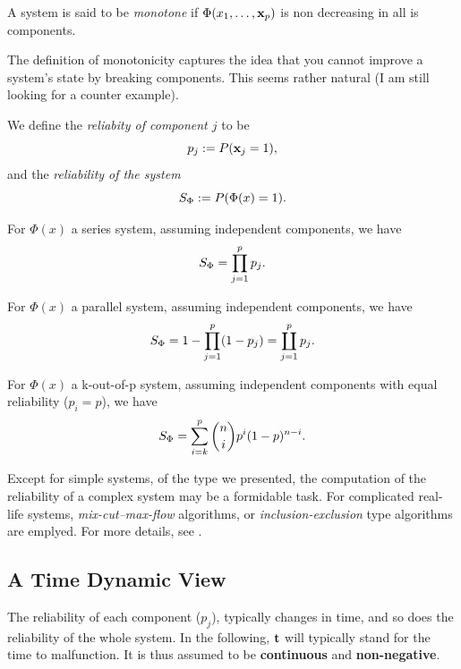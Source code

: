 \begin{definition}
A system is said to be \emph{monotone} if $\Phi(x_1,\dots,\mathbf{x}_p)$ is non decreasing in all is components.
\end{definition}
The definition of monotonicity captures the idea that you cannot improve a system's state by breaking components.
This seems rather natural (I am still looking for a counter example).






\begin{definition}[Reliability]
We define the \emph{reliabity of component $j$} to be $$p_j:= P(\mathbf{x}_j=1),$$ 
and  the \emph{reliability of the system} 
$$ S_\Phi:=P(\Phi(x)=1).$$
\end{definition}


\begin{example}
For $\Phi(x)$ a series system, assuming independent components, we have
$$ S_\Phi= \prod_{j=1}^{p} p_j.$$
\end{example}


\begin{example}
For $\Phi(x)$ a parallel system, assuming independent components, we have
$$ S_\Phi= 1-\prod_{j=1}^{p} (1-p_j)= \coprod_{j=1}^p p_j. $$
\end{example}


\begin{example}
For $\Phi(x)$ a k-out-of-p system, assuming independent components with equal reliability ($p_i=p$), we have
$$ S_\Phi= \sum_{i=k}^{p} \binom{n}{i} p^i (1-p)^{n-i} .$$
\end{example}


\begin{extra}
Except for simple systems, of the type we presented, the computation of the reliability of a complex system may be a formidable task. 
For complicated real-life systems, \emph{mix-cut--max-flow} algorithms, or \emph{inclusion-exclusion} type algorithms are emplyed. 
For more details, see \cite{aven_stochastic_1999}.
\end{extra}



\subsection{A Time Dynamic View}
The reliability of each component ($p_j$), typically changes in time, and so does the reliability of the whole system.
In the following, $\mathbf{t}$ will typically stand for the time to malfunction. It is thus assumed to be \textbf{continuous} and \textbf{non-negative}.


